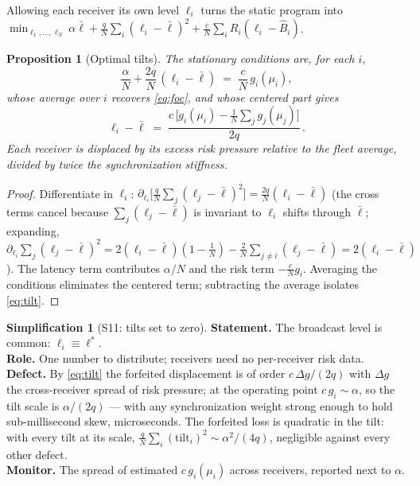 \documentclass[11pt, a4paper]{article}
\theoremstyle{definition}
\newtheorem{simplification}{Simplification}
\theoremstyle{plain}
\newtheorem{proposition}[theorem]{Proposition}
\theoremstyle{remark}
\begin{document}
Allowing each receiver its own level $\ell_i$ turns the static program
into
$\min_{\ell_1,\dots,\ell_N} \alpha\bar\ell
+ \tfrac{q}{N}\sum_i(\ell_i-\bar\ell)^2
+ \tfrac{c}{N}\sum_i R_i(\ell_i - \hat B_i)$.

\begin{proposition}[Optimal tilts]\label{prop:tilt}
The stationary conditions are, for each $i$,
\[
  \frac{\alpha}{N} + \frac{2q}{N}\,(\ell_i - \bar\ell)
  \;=\; \frac{c}{N}\, g_i(\mu_i),
\]
whose average over $i$ recovers \cref{eq:foc}, and whose centered part
gives
\begin{equation}\label{eq:tilt}
  \ell_i - \bar\ell
  \;=\;
  \frac{c\,\bigl[g_i(\mu_i) - \tfrac1N\sum_j g_j(\mu_j)\bigr]}{2q}\,.
\end{equation}
Each receiver is displaced by its \emph{excess} risk pressure relative
to the fleet average, divided by twice the synchronization stiffness.
\end{proposition}

\begin{proof}
Differentiate in $\ell_i$:
$\partial_{\ell_i}\bigl[\tfrac{q}{N}\sum_j(\ell_j-\bar\ell)^2\bigr]
= \tfrac{2q}{N}(\ell_i-\bar\ell)$ (the cross terms cancel because
$\sum_j(\ell_j-\bar\ell)$ is invariant to $\ell_i$ shifts through
$\bar\ell$; expanding,
$\partial_{\ell_i}\sum_j(\ell_j-\bar\ell)^2
= 2(\ell_i-\bar\ell)(1-\tfrac1N)
- \tfrac2N\sum_{j\ne i}(\ell_j-\bar\ell)
= 2(\ell_i-\bar\ell)$).  The latency term contributes $\alpha/N$ and
the risk term $-\tfrac{c}{N}g_i$.  Averaging the conditions eliminates
the centered term; subtracting the average isolates \cref{eq:tilt}.
\end{proof}

\setcounter{simplification}{10}%
\begin{simplification}[S11: tilts set to zero]\label{simp:tilt}
\textbf{Statement.}  The broadcast level is common:
$\ell_i \equiv \ell^*$.\\
\textbf{Role.}  One number to distribute; receivers need no
per-receiver risk data.\\
\textbf{Defect.}  By \cref{eq:tilt} the forfeited displacement is of
order $c\,\Delta g/(2q)$ with $\Delta g$ the cross-receiver spread of
risk pressure; at the operating point $c\,g_i \sim \alpha$, so the
tilt scale is $\alpha/(2q)$ --- with any synchronization weight strong
enough to hold sub-millisecond skew, microseconds.  The forfeited loss
is quadratic in the tilt: with every tilt at its scale,
$\tfrac{q}{N}\sum_i(\text{tilt}_i)^2 \sim \alpha^2/(4q)$, negligible
against every other defect.\\
\textbf{Monitor.}  The spread of estimated $c\,g_i(\mu_i)$ across
receivers, reported next to $\alpha$.
\end{simplification}
\end{document}
